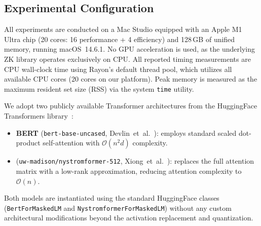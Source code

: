\documentclass[sigconf,anonymous,review,balance=false]{acmart}
\begin{document}
\subsection{Experimental Configuration}
\label{subsec:configuration}

All experiments are conducted on a Mac Studio equipped with an Apple M1 Ultra chip (20 cores: 16 performance + 4 efficiency) and 128\,GB of unified memory, running macOS~14.6.1. No GPU acceleration is used, as the underlying ZK library operates exclusively on CPU. All reported timing measurements are CPU wall-clock time using Rayon's default thread pool, which utilizes all available CPU cores (20 cores on our platform). Peak memory is measured as the maximum resident set size (RSS) via the system \texttt{time} utility.

We adopt two publicly available Transformer architectures from the HuggingFace Transformers library~\cite{HuggingFace}:

\begin{itemize}[leftmargin=3mm]
    \item \textbf{BERT} (\texttt{bert-base-uncased}, Devlin~et~al.~\cite{BERT}): employs standard scaled dot-product self-attention with $\mathcal{O}(n^2 d)$ complexity.
    \item \textbf{\nystromformer} (\texttt{uw-madison/nystromformer-512}, Xiong~et~al.~\cite{Nystromformer}): replaces the full attention matrix with a \nystrom low-rank approximation, reducing attention complexity to $\mathcal{O}(n)$. %
\end{itemize}

Both models are instantiated using the standard HuggingFace classes (\texttt{BertForMaskedLM} and \texttt{NystromformerForMaskedLM}) without any custom architectural modifications beyond the activation replacement and quantization. 

\end{document}
